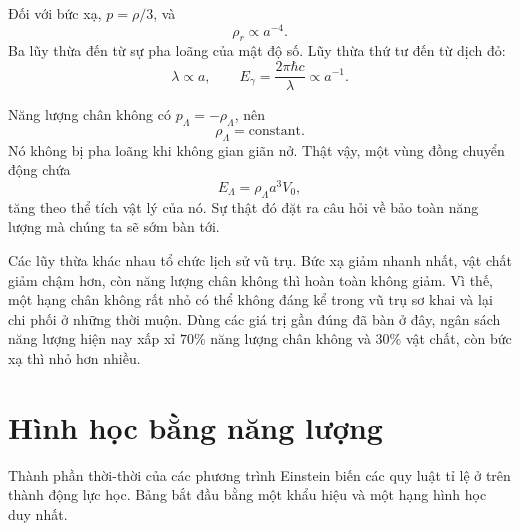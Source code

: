 Đối với bức xạ, \(p=\rho/3\), và
\begin{equation}
\rho_r\propto a^{-4}.
\end{equation}
Ba lũy thừa đến từ sự pha loãng của mật độ số. Lũy thừa thứ tư đến từ dịch đỏ:
\begin{equation}
\lambda\propto a,
\qquad
E_\gamma=\frac{2\pi\hbar c}{\lambda}\propto a^{-1}.
\end{equation}

\begin{classroomqa}
\end{classroomqa}

Năng lượng chân không có \(p_\Lambda=-\rho_\Lambda\), nên
\begin{equation}
\rho_\Lambda=\text{constant}.
\end{equation}
Nó không bị pha loãng khi không gian giãn nở. Thật vậy, một vùng đồng chuyển động chứa
\begin{equation}
E_\Lambda=\rho_\Lambda a^3V_0,
\end{equation}
tăng theo thể tích vật lý của nó. Sự thật đó đặt ra câu hỏi về bảo toàn năng lượng mà chúng ta sẽ sớm bàn tới.

Các lũy thừa khác nhau tổ chức lịch sử vũ trụ. Bức xạ giảm nhanh nhất, vật chất giảm chậm hơn, còn năng lượng chân không thì hoàn toàn không giảm. Vì thế, một hạng chân không rất nhỏ có thể không đáng kể trong vũ trụ sơ khai và lại chi phối ở những thời muộn. Dùng các giá trị gần đúng đã bàn ở đây, ngân sách năng lượng hiện nay xấp xỉ \(70\%\) năng lượng chân không và \(30\%\) vật chất, còn bức xạ thì nhỏ hơn nhiều.

\section{Hình học bằng năng lượng}

Thành phần thời-thời của các phương trình Einstein biến các quy luật tỉ lệ ở trên thành động lực học. Bảng bắt đầu bằng một khẩu hiệu và một hạng hình học duy nhất.

